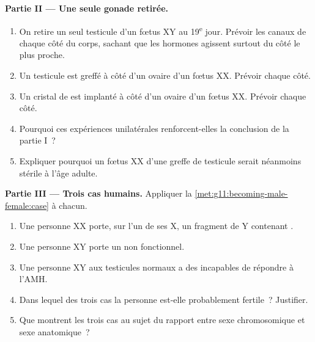 \begin{problem}
\medskip
\noindent\textbf{Partie II --- Une seule gonade retirée.}
\begin{enumerate}[resume]
  \item On retire un seul testicule d'un fœtus XY au
        19\textsuperscript{e} jour. Prévoir les canaux de chaque côté
        du corps, sachant que les hormones agissent surtout du côté le
        plus proche.
  \item Un testicule est greffé à côté d'un ovaire d'un fœtus XX.
        Prévoir chaque côté.
  \item Un cristal de  est implanté à côté d'un ovaire d'un
        fœtus XX. Prévoir chaque côté.
  \item Pourquoi ces expériences unilatérales renforcent-elles la
        conclusion de la partie I~?
  \item Expliquer pourquoi un fœtus XX  d'une greffe de
        testicule serait néanmoins stérile à l'âge adulte.
\end{enumerate}

\medskip
\noindent\textbf{Partie III --- Trois cas humains.}
Appliquer la \cref{met:g11:becoming-male-female:case} à chacun.
\begin{enumerate}[resume]
  \item Une personne XX porte, sur l'un de ses  X, un
        fragment de Y contenant .
  \item Une personne XY porte un  non fonctionnel.
  \item Une personne XY aux testicules normaux a des 
        incapables de répondre à l'AMH.
  \item Dans lequel des trois cas la personne est-elle probablement
        fertile~? Justifier.
  \item Que montrent les trois cas au sujet du rapport entre sexe
        chromosomique et sexe anatomique~?
\end{enumerate}


\end{problem}
